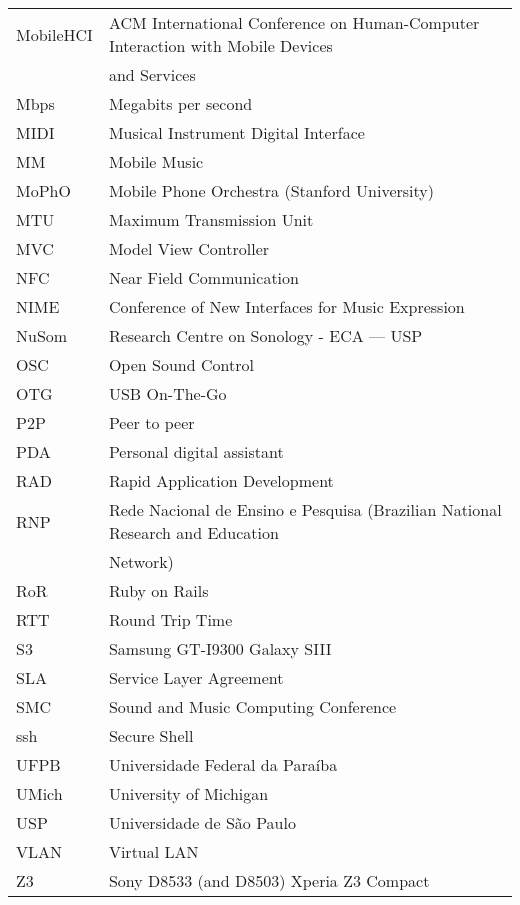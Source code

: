 \documentclass[11pt,twoside,a4paper]{book}
\begin{document}
\begin{longtable}{ll}
		MobileHCI	& ACM International Conference on Human-Computer Interaction with Mobile Devices\\
		            & and Services\\
		Mbps        & Megabits per second\\
		MIDI        & Musical Instrument Digital Interface\\
		MM          & Mobile Music\\
		MoPhO		& Mobile Phone Orchestra (Stanford University)\\
		MTU			& Maximum Transmission Unit\\
		MVC         & Model View Controller\\
		NFC         & Near Field Communication\\
		NIME		& Conference of New Interfaces for Music Expression\\
		NuSom		& Research Centre on Sonology - ECA --- USP\\
		OSC		    & Open Sound Control\\
		OTG         & USB On-The-Go\\
		P2P         & Peer to peer\\
		PDA		    & Personal digital assistant\\
		RAD		    & Rapid Application Development\\
		RNP		    & Rede Nacional de Ensino e Pesquisa (Brazilian National Research and Education\\
		            & Network)\\
		RoR		    & Ruby on Rails\\
		RTT		    & Round Trip Time\\
		S3		    & Samsung GT-I9300 Galaxy SIII\\
		SLA			& Service Layer Agreement\\
		SMC		    & Sound and Music Computing Conference\\
		ssh		    & Secure Shell\\
		UFPB	    & Universidade Federal da Paraíba\\
		UMich	    & University of Michigan\\
		USP         & Universidade de São Paulo\\
		VLAN        & Virtual LAN\\
		Z3		    & Sony D8533 (and D8503) Xperia Z3 Compact\\
		
		
	\end{longtable}
	\printnomenclature
	
\end{document}
